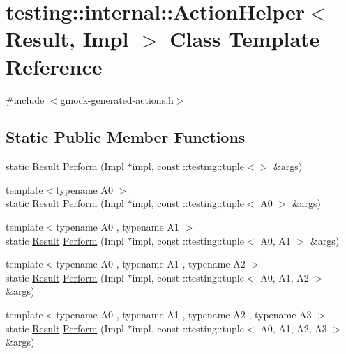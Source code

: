 \hypertarget{classtesting_1_1internal_1_1_action_helper}{}\section{testing\+:\+:internal\+:\+:Action\+Helper$<$ Result, Impl $>$ Class Template Reference}
\label{classtesting_1_1internal_1_1_action_helper}


{\ttfamily \#include $<$gmock-\/generated-\/actions.\+h$>$}

\subsection*{Static Public Member Functions}
\begin{DoxyCompactItemize}
\item 
static \hyperlink{typedefs__d_8js_a28287671eaf7406afd604bd055ba4066}{Result} \hyperlink{classtesting_1_1internal_1_1_action_helper_a25176836b0a381d883d61c3a2dc60662}{Perform} (Impl $\ast$impl, const \+::testing\+::tuple$<$$>$ \&args)
\item 
{\footnotesize template$<$typename A0 $>$ }\\static \hyperlink{typedefs__d_8js_a28287671eaf7406afd604bd055ba4066}{Result} \hyperlink{classtesting_1_1internal_1_1_action_helper_a08d2e199b0a3a1f9e05982cae07db3ec}{Perform} (Impl $\ast$impl, const \+::testing\+::tuple$<$ A0 $>$ \&args)
\item 
{\footnotesize template$<$typename A0 , typename A1 $>$ }\\static \hyperlink{typedefs__d_8js_a28287671eaf7406afd604bd055ba4066}{Result} \hyperlink{classtesting_1_1internal_1_1_action_helper_a96d8d8399ff3322e77ba1de51c166f4e}{Perform} (Impl $\ast$impl, const \+::testing\+::tuple$<$ A0, A1 $>$ \&args)
\item 
{\footnotesize template$<$typename A0 , typename A1 , typename A2 $>$ }\\static \hyperlink{typedefs__d_8js_a28287671eaf7406afd604bd055ba4066}{Result} \hyperlink{classtesting_1_1internal_1_1_action_helper_ad450478d185cbcac0e1383f7517f5c36}{Perform} (Impl $\ast$impl, const \+::testing\+::tuple$<$ A0, A1, A2 $>$ \&args)
\item 
{\footnotesize template$<$typename A0 , typename A1 , typename A2 , typename A3 $>$ }\\static \hyperlink{typedefs__d_8js_a28287671eaf7406afd604bd055ba4066}{Result} \hyperlink{classtesting_1_1internal_1_1_action_helper_a2ceda08aeb7b9fd1ad6ccb0821a3ea39}{Perform} (Impl $\ast$impl, const \+::testing\+::tuple$<$ A0, A1, A2, A3 $>$ \&args)
$$
\end{DoxyCompactItemize}
